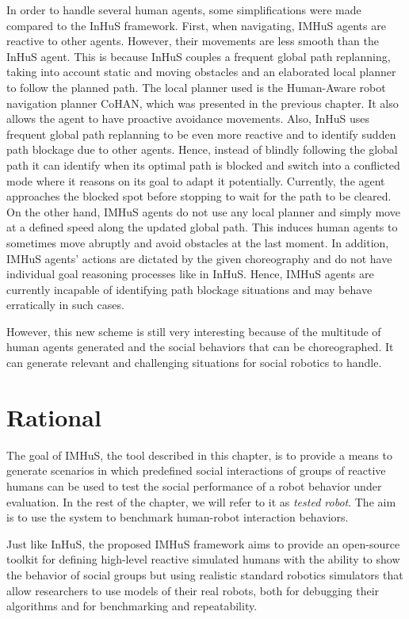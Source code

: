 In order to handle several human agents, some simplifications were made compared to the InHuS framework. First, when navigating, IMHuS agents are reactive to other agents. However, their movements are less smooth than the InHuS agent. This is because InHuS couples a frequent global path replanning, taking into account static and moving obstacles and an elaborated local planner to follow the planned path. The local planner used is the Human-Aware robot navigation planner CoHAN, which was presented in the previous chapter. It also allows the agent to have proactive avoidance movements. Also, InHuS uses frequent global path replanning to be even more reactive and to identify sudden path blockage due to other agents. Hence, instead of blindly following the global path it can identify when its optimal path is blocked and switch into a conflicted mode where it reasons on its goal to adapt it potentially. Currently, the agent approaches the blocked spot before stopping to wait for the path to be cleared. 
On the other hand, IMHuS agents do not use any local planner and simply move at a defined speed along the updated global path. This induces human agents to sometimes move abruptly and avoid obstacles at the last moment. 
In addition, IMHuS agents' actions are dictated by the given choreography and do not have individual goal reasoning processes like in InHuS. Hence, IMHuS agents are currently incapable of identifying path blockage situations and may behave erratically in such cases.  

However, this new scheme is still very interesting because of the multitude of human agents generated and the social behaviors that can be choreographed. It can generate relevant and challenging situations for social robotics to handle.


\section{Rational}

The goal of IMHuS, the tool described in this chapter, is to provide a means to generate scenarios in which predefined social interactions of groups of reactive humans can be used to test the social performance of a robot behavior under evaluation. In the rest of the chapter, we will refer to it as \textit{tested robot}. The aim is to use the system to benchmark human-robot interaction behaviors.

Just like InHuS, the proposed IMHuS framework aims to provide an open-source toolkit for defining high-level reactive simulated humans with the ability to show the behavior of social groups but using realistic standard robotics simulators that allow researchers to use models of their real robots, both for debugging their algorithms and for benchmarking and repeatability.



